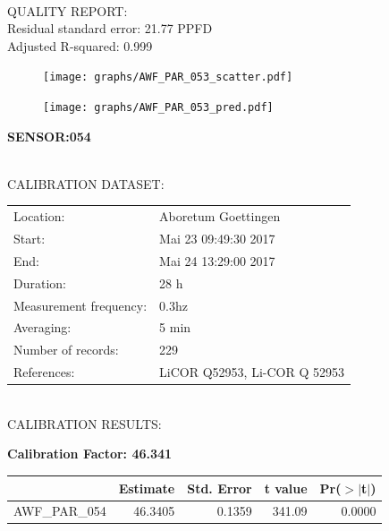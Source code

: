 \documentclass[oneside]{report}
\begin{document}
\hrulefill\\
QUALITY REPORT:\\
Residual standard error: 21.77 PPFD\\
Adjusted R-squared: 0.999



\begin{figure}[H]
  \centering
  \texttt{[image: graphs/AWF\_PAR\_053\_scatter.pdf]}
\end{figure}




\begin{figure}[H]
  \centering
  \texttt{[image: graphs/AWF\_PAR\_053\_pred.pdf]}
\end{figure}

\pagebreak


\begin{center}
\large{\textbf{SENSOR:054}}\\
\end{center}

\hrulefill\\
CALIBRATION DATASET:\\
\begin{table}[h!]
  \centering
  \label{tab:table1}
  \begin{tabular}{ll}
    Location: & Aboretum Goettingen\\ 
    
    
    Start:  & Mai 23 09:49:30 2017 \\
    End:   & Mai 24 13:29:00 2017\\ 
    Duration: & 28 h\\
    Measurement frequency: & 0.3hz\\
    Averaging:  &5 min\\
    Number of records: & 229 \\
    References: & LiCOR Q52953, Li-COR Q 52953 \\
  \end{tabular}
\end{table}

\hrulefill\\
CALIBRATION RESULTS:\\


\begin{center}
\textbf{\large{Calibration Factor: 46.341}}\\
\end{center}
\begin{table}[ht]
\centering
\begin{tabular}{rrrrr}
  \hline
 & Estimate & Std. Error & t value & Pr($>$$|$t$|$) \\ 
  \hline
AWF\_PAR\_054 & 46.3405 & 0.1359 & 341.09 & 0.0000 \\ 
   \hline
\end{tabular}
\end{table}
\end{document}

